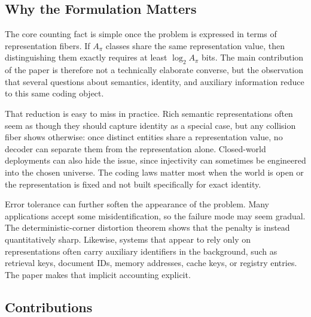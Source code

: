 \subsection{Why the Formulation Matters}

The core counting fact is simple once the problem is expressed in terms of representation fibers. If $A_\pi$ classes share the same representation value, then distinguishing them exactly requires at least $\log_2 A_\pi$ bits. The main contribution of the paper is therefore not a technically elaborate converse, but the observation that several questions about semantics, identity, and auxiliary information reduce to this same coding object.

That reduction is easy to miss in practice. Rich semantic representations often seem as though they should capture identity as a special case, but any collision fiber shows otherwise: once distinct entities share a representation value, no decoder can separate them from the representation alone. Closed-world deployments can also hide the issue, since injectivity can sometimes be engineered into the chosen universe. The coding laws matter most when the world is open or the representation is fixed and not built specifically for exact identity.

Error tolerance can further soften the appearance of the problem. Many applications accept some misidentification, so the failure mode may seem gradual. The deterministic-corner distortion theorem shows that the penalty is instead quantitatively sharp. Likewise, systems that appear to rely only on representations often carry auxiliary identifiers in the background, such as retrieval keys, document IDs, memory addresses, cache keys, or registry entries. The paper makes that implicit accounting explicit.

\subsection{Contributions}

